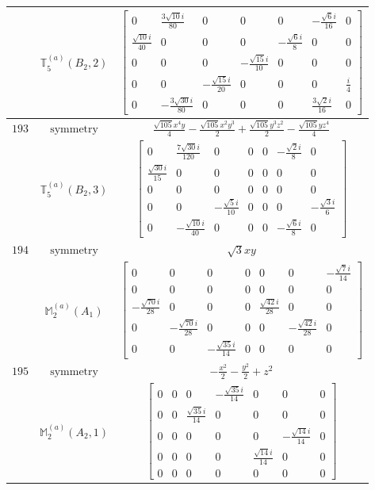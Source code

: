 \documentclass[fleqn,8pt,landscape]{jsarticle}
\begin{document}
\begin{longtable}{ccc}
$  $ & $ \mathbb{T}_{5}^{(a)}(B_{2},2) $ & $ \begin{bmatrix} 0 & \frac{3 \sqrt{10} i}{80} & 0 & 0 & 0 & - \frac{\sqrt{6} i}{16} & 0 \\ \frac{\sqrt{10} i}{40} & 0 & 0 & 0 & - \frac{\sqrt{6} i}{8} & 0 & 0 \\ 0 & 0 & 0 & - \frac{\sqrt{15} i}{10} & 0 & 0 & 0 \\ 0 & 0 & - \frac{\sqrt{15} i}{20} & 0 & 0 & 0 & \frac{i}{4} \\ 0 & - \frac{3 \sqrt{30} i}{80} & 0 & 0 & 0 & \frac{3 \sqrt{2} i}{16} & 0 \end{bmatrix} $ \\ \hline
$ 193 $ & $ \text{symmetry} $ & $ \frac{\sqrt{105} x^{4} y}{4} - \frac{\sqrt{105} x^{2} y^{3}}{2} + \frac{\sqrt{105} y^{3} z^{2}}{2} - \frac{\sqrt{105} y z^{4}}{4} $ \\
$  $ & $ \mathbb{T}_{5}^{(a)}(B_{2},3) $ & $ \begin{bmatrix} 0 & \frac{7 \sqrt{30} i}{120} & 0 & 0 & 0 & - \frac{\sqrt{2} i}{8} & 0 \\ \frac{\sqrt{30} i}{15} & 0 & 0 & 0 & 0 & 0 & 0 \\ 0 & 0 & 0 & 0 & 0 & 0 & 0 \\ 0 & 0 & - \frac{\sqrt{5} i}{10} & 0 & 0 & 0 & - \frac{\sqrt{3} i}{6} \\ 0 & - \frac{\sqrt{10} i}{40} & 0 & 0 & 0 & - \frac{\sqrt{6} i}{8} & 0 \end{bmatrix} $ \\ \hline
$ 194 $ & $ \text{symmetry} $ & $ \sqrt{3} x y $ \\
$  $ & $ \mathbb{M}_{2}^{(a)}(A_{1}) $ & $ \begin{bmatrix} 0 & 0 & 0 & 0 & 0 & 0 & - \frac{\sqrt{7} i}{14} \\ 0 & 0 & 0 & 0 & 0 & 0 & 0 \\ - \frac{\sqrt{70} i}{28} & 0 & 0 & 0 & \frac{\sqrt{42} i}{28} & 0 & 0 \\ 0 & - \frac{\sqrt{70} i}{28} & 0 & 0 & 0 & - \frac{\sqrt{42} i}{28} & 0 \\ 0 & 0 & - \frac{\sqrt{35} i}{14} & 0 & 0 & 0 & 0 \end{bmatrix} $ \\ \hline
$ 195 $ & $ \text{symmetry} $ & $ - \frac{x^{2}}{2} - \frac{y^{2}}{2} + z^{2} $ \\
$  $ & $ \mathbb{M}_{2}^{(a)}(A_{2},1) $ & $ \begin{bmatrix} 0 & 0 & 0 & - \frac{\sqrt{35} i}{14} & 0 & 0 & 0 \\ 0 & 0 & \frac{\sqrt{35} i}{14} & 0 & 0 & 0 & 0 \\ 0 & 0 & 0 & 0 & 0 & - \frac{\sqrt{14} i}{14} & 0 \\ 0 & 0 & 0 & 0 & \frac{\sqrt{14} i}{14} & 0 & 0 \\ 0 & 0 & 0 & 0 & 0 & 0 & 0 \end{bmatrix} $ \\ \hline

\end{longtable}
\end{document}
